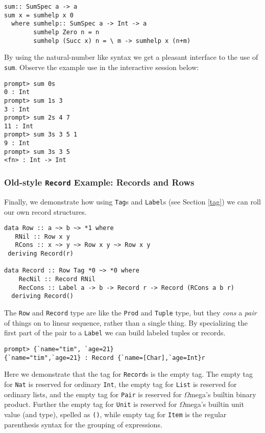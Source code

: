 \documentclass[11pt,twoside]{article}
\newcommand{\om}{$\Omega$mega}
\begin{document}
\begin{verbatim}
sum:: SumSpec a -> a
sum x = sumhelp x 0
  where sumhelp:: SumSpec a -> Int -> a
        sumhelp Zero n = n
        sumhelp (Succ x) n = \ m -> sumhelp x (n+m)
\end{verbatim}        
By using the natural-number like syntax we get a pleasant interface to
the use of {\tt sum}. Observe the example use in the interactive session
below:
\begin{verbatim}
prompt> sum 0s
0 : Int
prompt> sum 1s 3
3 : Int
prompt> sum 2s 4 7
11 : Int
prompt> sum 3s 3 5 1
9 : Int
prompt> sum 3s 3 5
<fn> : Int -> Int
\end{verbatim}

\subsubsection{Old-style {\tt Record} Example: Records and Rows}
Finally, we demonstrate how using {\tt Tag}s and {\tt Label}s
(see Section \ref{tag}) we can roll our own record structures. 

\begin{verbatim}
data Row :: a ~> b ~> *1 where
   RNil :: Row x y
   RCons :: x ~> y ~> Row x y ~> Row x y
 deriving Record(r)

data Record :: Row Tag *0 ~> *0 where
    RecNil :: Record RNil
    RecCons :: Label a -> b -> Record r -> Record (RCons a b r)
  deriving Record()
\end{verbatim} 
The {\tt Row} and {\tt Record} type are like the {\tt Prod} and
{\tt Tuple} type, but they {\it cons} a {\it pair} of things on to
linear sequence, rather than a single thing. By specializing
the first part of the pair to a {\tt Label} we can build labeled
tuples or records.

\begin{verbatim}
prompt> {`name="tim", `age=21}
{`name="tim",`age=21} : Record {`name=[Char],`age=Int}r
\end{verbatim} 

Here we demonstrate that the tag for {\tt Record}s is the empty tag.
The empty tag for {\tt Nat} is reserved for ordinary {\tt Int},
the empty tag for {\tt List} is reserved for ordinary lists,
and the empty tag for {\tt Pair} is reserved for \om's builtin binary
product. Further the empty tag for {\tt Unit} is reserved for \om's builtin
unit value (and type), spelled as \verb+()+, while empty tag for {\tt Item} is
the regular parenthesis syntax for the grouping of expressions.
\end{document}
